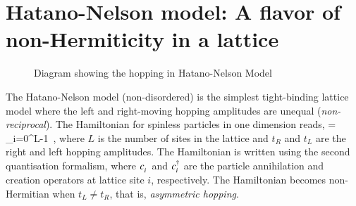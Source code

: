 \section{Hatano-Nelson model: A flavor of non-Hermiticity in a lattice}
\begin{figure}[H]
    \centering 
    
    \caption{Diagram showing the hopping in Hatano-Nelson Model}
\end{figure}%
The Hatano-Nelson model (non-disordered) is the simplest tight-binding
lattice model where the left and right-moving hopping amplitudes are unequal
(\emph{non-reciprocal}). The Hamiltonian for spinless particles in one dimension reads,
\blgn
 \hHN = \sum_{i=0}^{L-1} \big[t_R c\y_i c\py_{i+1} + t_L c\y_{i+1} c\py_i \big]\,,   
\elgn
where $L$ is the number of sites in the lattice and $t_R$ and $t_L$ are the right and left hopping
amplitudes. The Hamiltonian is written using the second quantisation formalism, where $c\py_i$ and  $c^\dag_i$ are the particle annihilation and
creation operators at lattice site $i$, respectively. {The Hamiltonian becomes non-Hermitian when $t_L\neq t_R$, that is, \textit{asymmetric hopping}.} 

